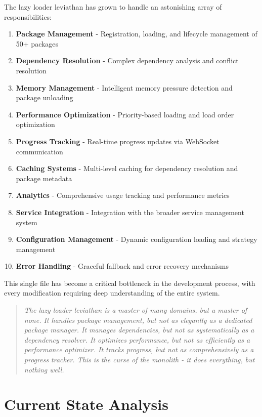 \documentclass[11pt]{article}
\begin{document}
The lazy loader leviathan has grown to handle an astonishing array of responsibilities:

\begin{enumerate}
\item \textbf{Package Management} - Registration, loading, and lifecycle management of 50+ packages
\item \textbf{Dependency Resolution} - Complex dependency analysis and conflict resolution
\item \textbf{Memory Management} - Intelligent memory pressure detection and package unloading
\item \textbf{Performance Optimization} - Priority-based loading and load order optimization
\item \textbf{Progress Tracking} - Real-time progress updates via WebSocket communication
\item \textbf{Caching Systems} - Multi-level caching for dependency resolution and package metadata
\item \textbf{Analytics} - Comprehensive usage tracking and performance metrics
\item \textbf{Service Integration} - Integration with the broader service management system
\item \textbf{Configuration Management} - Dynamic configuration loading and strategy management
\item \textbf{Error Handling} - Graceful fallback and error recovery mechanisms
\end{enumerate}

This single file has become a critical bottleneck in the development process, with every modification requiring deep understanding of the entire system.

\begin{quote}
\emph{The lazy loader leviathan is a master of many domains, but a master of none. It handles package management, but not as elegantly as a dedicated package manager. It manages dependencies, but not as systematically as a dependency resolver. It optimizes performance, but not as efficiently as a performance optimizer. It tracks progress, but not as comprehensively as a progress tracker. This is the curse of the monolith - it does everything, but nothing well.}
\end{quote}

\section{Current State Analysis}
\end{document}
